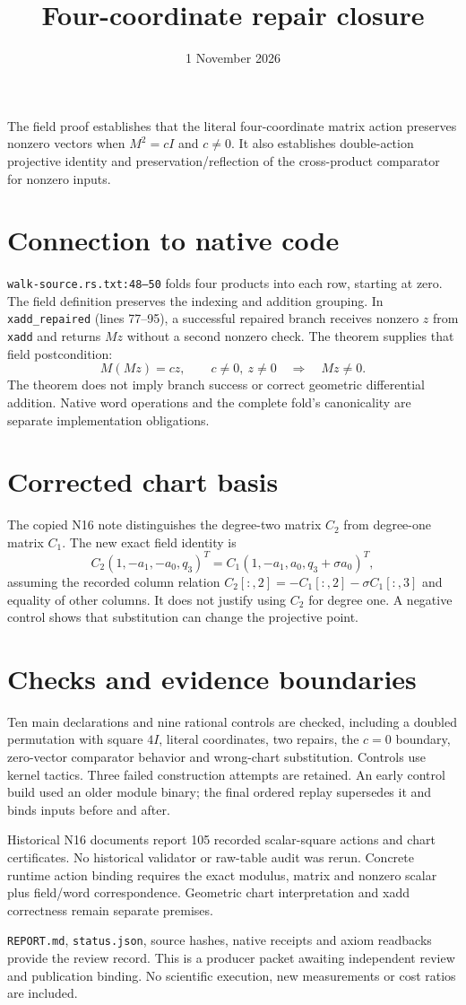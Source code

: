 \documentclass[10pt]{article}
\title{Four-coordinate repair closure}\date{1 November 2026}
\begin{document}
\maketitle
The field proof establishes that the literal four-coordinate matrix action preserves nonzero vectors when $M^2=cI$ and $c\ne0$. It also establishes double-action projective identity and preservation/reflection of the cross-product comparator for nonzero inputs.
\section*{Connection to native code}
\texttt{walk-source.rs.txt:48--50} folds four products into each row, starting at zero. The field definition preserves the indexing and addition grouping. In \texttt{xadd\_repaired} (lines 77--95), a successful repaired branch receives nonzero $z$ from \texttt{xadd} and returns $Mz$ without a second nonzero check. The theorem supplies that field postcondition:
\[M(Mz)=cz,\qquad c\ne0,\ z\ne0\quad\Longrightarrow\quad Mz\ne0.\]
The theorem does not imply branch success or correct geometric differential addition. Native word operations and the complete fold's canonicality are separate implementation obligations.
\section*{Corrected chart basis}
The copied N16 note distinguishes the degree-two matrix $C_2$ from degree-one matrix $C_1$. The new exact field identity is
\[C_2(1,-a_1,-a_0,q_3)^T=C_1(1,-a_1,a_0,q_3+\sigma a_0)^T,\]
assuming the recorded column relation $C_2[:,2]=-C_1[:,2]-\sigma C_1[:,3]$ and equality of other columns. It does not justify using $C_2$ for degree one. A negative control shows that substitution can change the projective point.
\section*{Checks and evidence boundaries}
Ten main declarations and nine rational controls are checked, including a doubled permutation with square $4I$, literal coordinates, two repairs, the $c=0$ boundary, zero-vector comparator behavior and wrong-chart substitution. Controls use kernel tactics. Three failed construction attempts are retained. An early control build used an older module binary; the final ordered replay supersedes it and binds inputs before and after.

Historical N16 documents report 105 recorded scalar-square actions and chart certificates. No historical validator or raw-table audit was rerun. Concrete runtime action binding requires the exact modulus, matrix and nonzero scalar plus field/word correspondence. Geometric chart interpretation and xadd correctness remain separate premises.

\texttt{REPORT.md}, \texttt{status.json}, source hashes, native receipts and axiom readbacks provide the review record. This is a producer packet awaiting independent review and publication binding. No scientific execution, new measurements or cost ratios are included.
\end{document}
